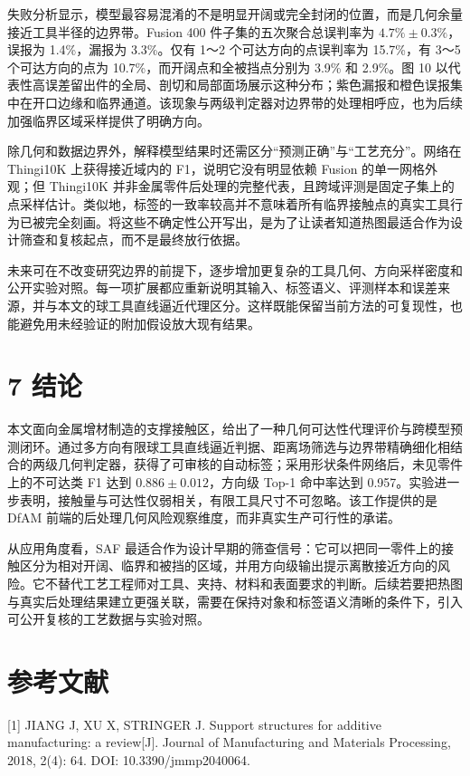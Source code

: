 失败分析显示，模型最容易混淆的不是明显开阔或完全封闭的位置，而是几何余量接近工具半径的边界带。Fusion 400 件子集的五次聚合总误判率为 \(4.7\%\pm0.3\%\)，误报为 1.4\%，漏报为 3.3\%。仅有 1～2 个可达方向的点误判率为 15.7\%，有 3～5 个可达方向的点为 10.7\%，而开阔点和全被挡点分别为 3.9\% 和 2.9\%。图 10 以代表性高误差留出件的全局、剖切和局部面场展示这种分布；紫色漏报和橙色误报集中在开口边缘和临界通道。该现象与两级判定器对边界带的处理相呼应，也为后续加强临界区域采样提供了明确方向。

除几何和数据边界外，解释模型结果时还需区分``预测正确''与``工艺充分''。网络在 Thingi10K 上获得接近域内的 F1，说明它没有明显依赖 Fusion 的单一网格外观；但 Thingi10K 并非金属零件后处理的完整代表，且跨域评测是固定子集上的点采样估计。类似地，标签的一致率较高并不意味着所有临界接触点的真实工具行为已被完全刻画。将这些不确定性公开写出，是为了让读者知道热图最适合作为设计筛查和复核起点，而不是最终放行依据。

未来可在不改变研究边界的前提下，逐步增加更复杂的工具几何、方向采样密度和公开实验对照。每一项扩展都应重新说明其输入、标签语义、评测样本和误差来源，并与本文的球工具直线逼近代理区分。这样既能保留当前方法的可复现性，也能避免用未经验证的附加假设放大现有结果。

\section{7 结论}\label{ux7ed3ux8bba}

本文面向金属增材制造的支撑接触区，给出了一种几何可达性代理评价与跨模型预测闭环。通过多方向有限球工具直线逼近判据、距离场筛选与边界带精确细化相结合的两级几何判定器，获得了可审核的自动标签；采用形状条件网络后，未见零件上的不可达类 F1 达到 \(0.886\pm0.012\)，方向级 Top-1 命中率达到 0.957。实验进一步表明，接触量与可达性仅弱相关，有限工具尺寸不可忽略。该工作提供的是 DfAM 前端的后处理几何风险观察维度，而非真实生产可行性的承诺。

从应用角度看，SAF 最适合作为设计早期的筛查信号：它可以把同一零件上的接触区分为相对开阔、临界和被挡的区域，并用方向级输出提示离散接近方向的风险。它不替代工艺工程师对工具、夹持、材料和表面要求的判断。后续若要把热图与真实后处理结果建立更强关联，需要在保持对象和标签语义清晰的条件下，引入可公开复核的工艺数据与实验对照。

\section{参考文献}\label{ux53c2ux8003ux6587ux732e}

{[}1{]} JIANG J, XU X, STRINGER J. Support structures for additive manufacturing: a review{[}J{]}. Journal of Manufacturing and Materials Processing, 2018, 2(4): 64. DOI: 10.3390/jmmp2040064.

